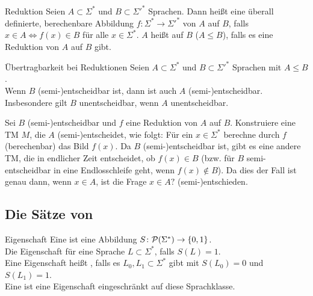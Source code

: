 \begin{Def}{Reduktion}
    Seien $A \subset \Sigma^\ast$ und $B \subset \Sigma'^\ast$ Sprachen.
    Dann heißt eine überall definierte, berechenbare Abbildung
    $f\colon \Sigma^\ast \rightarrow \Sigma'^\ast$  von $A$ auf $B$, falls
    $x \in A \iff f(x) \in B$ für alle $x \in \Sigma^\ast$.
    $A$ heißt auf $B$  ($A \le B$), falls es eine Reduktion von $A$ auf $B$
    gibt.
\end{Def}

\begin{Satz}{Übertragbarkeit bei Reduktionen}
    Seien $A \subset \Sigma^\ast$ und $B \subset \Sigma'^\ast$ Sprachen mit $A \le B$.\\
    Wenn $B$ (semi-)entscheidbar ist, dann ist auch $A$ (semi-)entscheidbar.\\
    Insbesondere gilt $B$ unentscheidbar, wenn $A$ unentscheidbar.
\end{Satz}

\begin{Beweis}
    Sei $B$ (semi-)entscheidbar und $f$ eine Reduktion von $A$ auf $B$.
    Konstruiere eine TM $M$, die $A$ (semi-)entscheidet, wie folgt:
    Für ein $x \in \Sigma^\ast$ berechne durch $f$ (berechenbar) das Bild $f(x)$.
    Da $B$ (semi-)entscheidbar ist, gibt es eine andere TM, die in endlicher Zeit entscheidet,
    ob $f(x) \in B$ (bzw. für $B$ semi-entscheidbar in eine Endlosschleife geht,
    wenn $f(x) \notin B$).
    Da dies der Fall ist genau dann, wenn $x \in A$, ist die Frage $x \in A?$ (semi-)entschieden.
\end{Beweis}

\subsection{%
    Die Sätze von %
}

\begin{Def}{Eigenschaft}
    Eine  ist eine Abbildung
    $S\colon \mathcal{P}(\Sigma^\ast) \rightarrow \{0, 1\}$.\\
    Die Eigenschaft  für eine Sprache $L \subset \Sigma^\ast$, falls $S(L) = 1$.\\
    Eine Eigenschaft heißt , falls es $L_0, L_1 \subset \Sigma^\ast$ gibt
    mit $S(L_0) = 0$ und $S(L_1) = 1$.\\
    Eine  ist eine Eigenschaft
    eingeschränkt auf diese Sprachklasse.
\end{Def}


